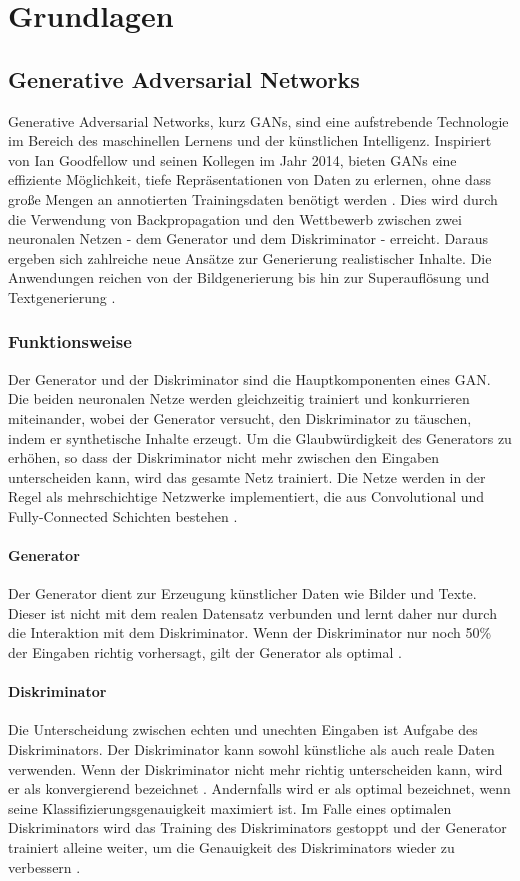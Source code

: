 \chapter{Grundlagen}

\section{Generative Adversarial Networks}
Generative Adversarial Networks, kurz GANs, sind eine aufstrebende Technologie im Bereich des maschinellen Lernens und der künstlichen Intelligenz. Inspiriert von Ian Goodfellow und seinen Kollegen im Jahr 2014, bieten GANs eine effiziente Möglichkeit, tiefe Repräsentationen von Daten zu erlernen, ohne dass große Mengen an annotierten Trainingsdaten benötigt werden \cite{Creswell.2018}. 
Dies wird durch die Verwendung von Backpropagation und den Wettbewerb zwischen zwei neuronalen Netzen - dem Generator und dem Diskriminator - erreicht. 
Daraus ergeben sich zahlreiche neue Ansätze zur Generierung realistischer Inhalte. 
Die Anwendungen reichen von der Bildgenerierung bis hin zur Superauflösung und Textgenerierung \cite{Aggarwal.2021}.

\subsection{Funktionsweise}
Der Generator und der Diskriminator sind die Hauptkomponenten eines GAN. Die beiden neuronalen Netze werden gleichzeitig trainiert und konkurrieren miteinander, wobei der Generator versucht, den Diskriminator zu täuschen, indem er synthetische Inhalte erzeugt. Um die Glaubwürdigkeit des Generators zu erhöhen, so dass der Diskriminator nicht mehr zwischen den Eingaben unterscheiden kann, wird das gesamte Netz trainiert. Die Netze werden in der Regel als mehrschichtige Netzwerke implementiert, die aus Convolutional und Fully-Connected Schichten bestehen \cite{Creswell.2018}.

\subsubsection*{Generator}
Der Generator dient zur Erzeugung künstlicher Daten wie Bilder und Texte. 
Dieser ist nicht mit dem realen Datensatz verbunden und lernt daher nur durch die Interaktion mit dem Diskriminator. Wenn der Diskriminator nur noch 50\% der Eingaben richtig vorhersagt, gilt der Generator als optimal \cite{Creswell.2018}.

\subsubsection*{Diskriminator}
Die Unterscheidung zwischen echten und unechten Eingaben ist Aufgabe des Diskriminators. Der Diskriminator kann sowohl künstliche als auch reale Daten verwenden. 
Wenn der Diskriminator nicht mehr richtig unterscheiden kann, wird er als konvergierend bezeichnet \cite{Aggarwal.2021}. Andernfalls wird er als optimal bezeichnet, wenn seine Klassifizierungsgenauigkeit maximiert ist. Im Falle eines optimalen Diskriminators wird das Training des Diskriminators gestoppt und der Generator trainiert alleine weiter, um die Genauigkeit des Diskriminators wieder zu verbessern \cite{Creswell.2018}.

